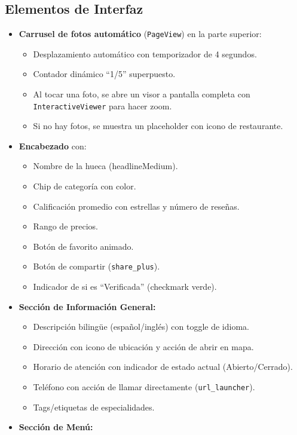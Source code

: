 \documentclass[11pt, a4paper, oneside]{report}
\begin{document}
\subsection{Elementos de Interfaz}
\begin{itemize}
  \item \textbf{Carrusel de fotos automático} (\texttt{PageView}) en la parte superior:
  \begin{itemize}
    \item Desplazamiento automático con temporizador de 4 segundos.
    \item Contador dinámico ``1/5'' superpuesto.
    \item Al tocar una foto, se abre un visor a pantalla completa con \texttt{InteractiveViewer} para hacer zoom.
    \item Si no hay fotos, se muestra un placeholder con icono de restaurante.
  \end{itemize}
  \item \textbf{Encabezado} con:
  \begin{itemize}
    \item Nombre de la hueca (headlineMedium).
    \item Chip de categoría con color.
    \item Calificación promedio con estrellas y número de reseñas.
    \item Rango de precios.
    \item Botón de favorito animado.
    \item Botón de compartir (\texttt{share\_plus}).
    \item Indicador de si es ``Verificada'' (checkmark verde).
  \end{itemize}
  \item \textbf{Sección de Información General:}
  \begin{itemize}
    \item Descripción bilingüe (español/inglés) con toggle de idioma.
    \item Dirección con icono de ubicación y acción de abrir en mapa.
    \item Horario de atención con indicador de estado actual (Abierto/Cerrado).
    \item Teléfono con acción de llamar directamente (\texttt{url\_launcher}).
    \item Tags/etiquetas de especialidades.
  \end{itemize}
  \item \textbf{Sección de Menú:}
  \begin{itemize}

\end{itemize}
\end{itemize}
\end{document}
